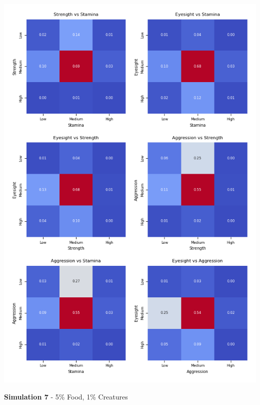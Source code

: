 \documentclass{article}
\begin{document}
\begin{center}
    \includegraphics[scale=0.9]{tests/6_confusion_matrices.png}
\end{center}
\textbf{Simulation 7} - 5\% Food, 1\% Creatures
\end{document}
